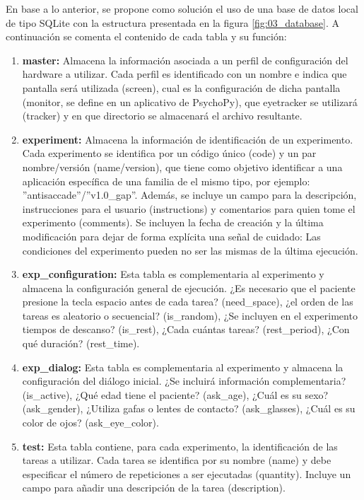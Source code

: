 \documentclass[\main/main.tex]{subfiles}
\begin{document}
		En base a lo anterior, se propone como solución el uso de una base de datos local de tipo SQLite con la estructura presentada en la figura \ref{fig:03_database}. A continuación se comenta el contenido de cada tabla y su función:
		\begin{enumerate}
			\item \textbf{master:} Almacena la información asociada a un perfil de configuración del hardware a utilizar. Cada perfil es identificado con un nombre e indica que pantalla será utilizada (screen), cual es la configuración de dicha pantalla (monitor, se define en un aplicativo de PsychoPy), que eyetracker se utilizará (tracker) y en que directorio se almacenará el archivo resultante.

			\item \textbf{experiment:} Almacena la información de identificación de un experimento. Cada experimento se identifica por un código único (code) y un par nombre/versión (name/version), que tiene como objetivo identificar a una aplicación específica de una familia de el mismo tipo, por ejemplo: ''antisaccade''/''v1.0\_gap''. Además, se incluye un campo para la descripción, instrucciones para el usuario (instructions) y comentarios para quien tome el experimento (comments). Se incluyen la fecha de creación y la última modificación para dejar de forma explícita una señal de cuidado: Las condiciones del experimento pueden no ser las mismas de la última ejecución.
			
			\item \textbf{exp\_configuration:} Esta tabla es complementaria al experimento y almacena la configuración general de ejecución. ¿Es necesario que el paciente presione la tecla espacio antes de cada tarea? (need\_space), ¿el orden de las tareas es aleatorio o secuencial? (is\_random), ¿Se incluyen en el experimento tiempos de descanso? (is\_rest), ¿Cada cuántas tareas? (rest\_period), ¿Con qué duración? (rest\_time).

			\item \textbf{exp\_dialog:} Esta tabla es complementaria al experimento y almacena la configuración del diálogo inicial. ¿Se incluirá información complementaria? (is\_active), ¿Qué edad tiene el paciente? (ask\_age), ¿Cuál es su sexo? (ask\_gender), ¿Utiliza gafas o lentes de contacto? (ask\_glasses), ¿Cuál es su color de ojos? (ask\_eye\_color).

			\item \textbf{test:} Esta tabla contiene, para cada experimento, la identificación de las tareas a utilizar. Cada tarea se identifica por su nombre (name) y debe especificar el número de repeticiones a ser ejecutadas (quantity). Incluye un campo para añadir una descripción de la tarea (description).


\end{enumerate}
\end{document}

